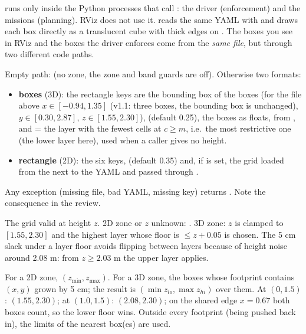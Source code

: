 \begin{keypoint}
 runs only inside the Python processes that call : the driver (enforcement) and
the missions (planning). RViz does not use it.  reads the same YAML with
 and draws each box directly as a translucent cube with thick edges on
. The boxes you see in RViz and the boxes the driver enforces come from the \emph{same
file}, but through two different code paths.
\end{keypoint}

Empty path:  (no zone, the zone and band guards are off). Otherwise two formats:
\begin{itemize}[itemsep=1pt]
\item \textbf{boxes} (3D): the rectangle keys are the bounding box of the boxes (for the file above
$x\in[-0.94,1.35]$ (v1.1: three boxes, the bounding box is unchanged), $y\in[0.30,2.87]$, $z\in[1.55,2.30]$),  (default 0.25), the boxes as floats,
 from , and  = the layer with the fewest cells at $c\ge m$, i.e.\ the
most restrictive one (the lower layer here), used when a caller gives no height.
\item \textbf{rectangle} (2D): the six keys,  (default 0.35) and, if  is set, the grid
loaded from the  next to the YAML and passed through .
\end{itemize}
Any exception (missing file, bad YAML, missing key) returns . Note the consequence in the review.

The grid valid at height $z$. 2D zone or $z$ unknown: . 3D zone: $z$ is clamped to
$[1.55, 2.30]$ and the highest layer whose floor is $\le z + 0.05$ is chosen. The 5 cm slack under a layer floor
avoids flipping between layers because of height noise around 2.08 m: from $z\ge2.03$ m the upper layer applies.

For a 2D zone, $(z_{\min}, z_{\max})$. For a 3D zone, the boxes whose footprint contains $(x,y)$ grown by 5 cm;
the result is $(\min z_{lo}, \max z_{hi})$ over them. At $(0,1.5)$: $(1.55, 2.30)$; at $(1.0,1.5)$: $(2.08, 2.30)$;
on the shared edge $x=0.67$ both boxes count, so the lower floor wins. Outside every footprint (being pushed back
in), the limits of the nearest box(es) are used.

